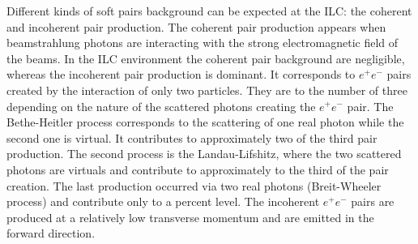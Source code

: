     Different kinds of soft pairs background can be expected at the \gls{ILC}: the coherent and incoherent pair production.
    The coherent pair production appears when beamstrahlung photons are interacting with the strong electromagnetic field of the beams.
    In the \gls{ILC} environment the coherent pair background are negligible, whereas the incoherent pair production is dominant.
    It corresponds to $e^+e^-$ pairs created by the interaction of only two particles.
    They are to the number of three depending on the nature of the scattered photons creating the $e^+e^-$ pair.
    The Bethe-Heitler process corresponds to the scattering of one real photon while the second one is virtual.
    It contributes to approximately two of the third pair production.
    The second process is the Landau-Lifshitz, where the two scattered photons are virtuals and contribute to approximately to the third of the pair creation.
    The last production occurred via two real photons (Breit-Wheeler process) and contribute only to a percent level.
    The incoherent $e^+e^-$ pairs are produced at a relatively low transverse momentum and are emitted in the forward direction.
    

